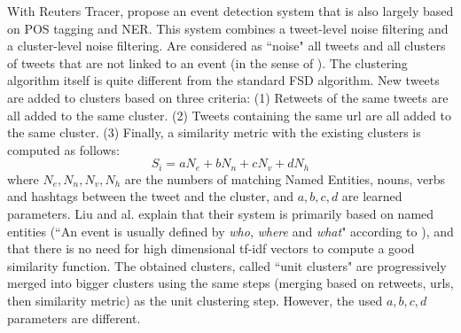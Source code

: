 With Reuters Tracer, \citet{liu_reuters_2016} propose an event detection system that is also largely based on POS tagging and NER. This system combines a tweet-level noise filtering and a cluster-level noise filtering. Are considered as ``noise" all tweets and all clusters of tweets that are not linked to an event (in the sense of \citet{mcminn_building_2013}). The clustering algorithm itself is quite different from the standard FSD algorithm. New tweets are added to clusters based on three criteria: (1) Retweets of the same tweets are all added to the same cluster. (2) Tweets containing the same url are all added to the same cluster. (3) Finally, a similarity metric with the existing clusters is computed as follows:
$$
S_i = aN_e + bN_n + cN_v + dN_h
$$
where $N_e,N_n,N_v,N_h$ are the numbers of matching Named Entities, nouns, verbs and hashtags between the tweet and the cluster, and $a, b, c, d$ are learned parameters. Liu and al. explain that their system is primarily based on named entities (``An event is usually defined by \textit{who}, \textit{where} and \textit{what}" according to \citet{mcminn_building_2013}), and that there is no need for high dimensional tf-idf vectors to compute a good similarity function. The obtained clusters, called ``unit clusters" are progressively merged into bigger clusters using the same steps (merging based on retweets, urls, then similarity metric) as the unit clustering step. However, the used $a, b, c, d$ parameters are different.

